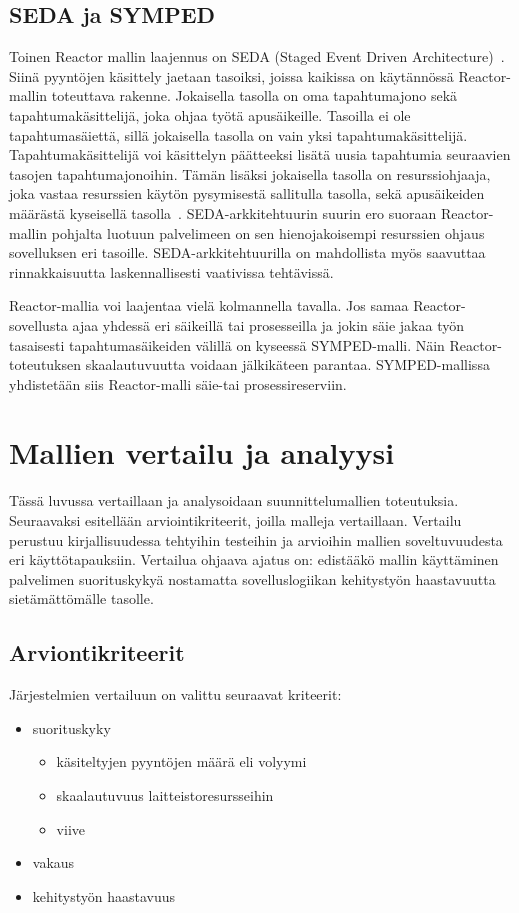 \documentclass[finnish]{tktltiki2}
\theoremstyle{definition}
\theoremstyle{remark}
\begin{document}
\subsection{SEDA ja SYMPED}

Toinen Reactor mallin laajennus on SEDA (Staged Event Driven Architecture)~\cite{welsh_seda_2001}.
Siinä pyyntöjen käsittely jaetaan tasoiksi, joissa kaikissa on
käytännössä Reactor-mallin toteuttava rakenne. Jokaisella tasolla
on oma tapahtumajono sekä tapahtumakäsittelijä, joka ohjaa työtä
apusäikeille. Tasoilla ei ole tapahtumasäiettä, sillä
jokaisella tasolla on vain yksi tapahtumakäsittelijä.
Tapahtumakäsittelijä voi käsittelyn päätteeksi
lisätä uusia tapahtumia seuraavien tasojen tapahtumajonoihin.
Tämän lisäksi jokaisella tasolla on resurssiohjaaja,
joka vastaa resurssien käytön pysymisestä sallitulla tasolla,
sekä apusäikeiden määrästä kyseisellä tasolla~\cite{welsh_seda_2001}.
SEDA-arkkitehtuurin suurin ero suoraan Reactor-mallin pohjalta luotuun
palvelimeen on sen hienojakoisempi resurssien ohjaus sovelluksen eri tasoille.
SEDA-arkkitehtuurilla on mahdollista myös saavuttaa rinnakkaisuutta
laskennallisesti vaativissa tehtävissä.

Reactor-mallia voi laajentaa vielä kolmannella tavalla.
Jos samaa Reactor-sovellusta ajaa yhdessä eri säikeillä tai prosesseilla
ja jokin säie jakaa työn tasaisesti tapahtumasäikeiden välillä
on kyseessä SYMPED-malli. Näin Reactor-toteutuksen
skaalautuvuutta voidaan jälkikäteen parantaa.
SYMPED-mallissa yhdistetään siis Reactor-malli säie-tai prosessireserviin.


\section{Mallien vertailu ja analyysi}\label{sec:vertailu}
Tässä luvussa vertaillaan ja analysoidaan
suunnittelumallien toteutuksia.
Seuraavaksi esitellään arviointikriteerit,
joilla malleja vertaillaan.
Vertailu perustuu kirjallisuudessa
tehtyihin testeihin ja arvioihin
mallien soveltuvuudesta eri
käyttötapauksiin.
Vertailua ohjaava ajatus on:
edistääkö mallin käyttäminen palvelimen
suorituskykyä 
nostamatta sovelluslogiikan kehitystyön haastavuutta
sietämättömälle tasolle.

\subsection{Arviontikriteerit}


Järjestelmien vertailuun on valittu seuraavat kriteerit:
\begin{itemize}
  \item suorituskyky
    \begin{itemize}
      \item käsiteltyjen pyyntöjen määrä eli volyymi
      \item skaalautuvuus laitteistoresursseihin
      \item viive
    \end{itemize}
  \item vakaus
  \item kehitystyön haastavuus
\end{itemize}
\end{document}
